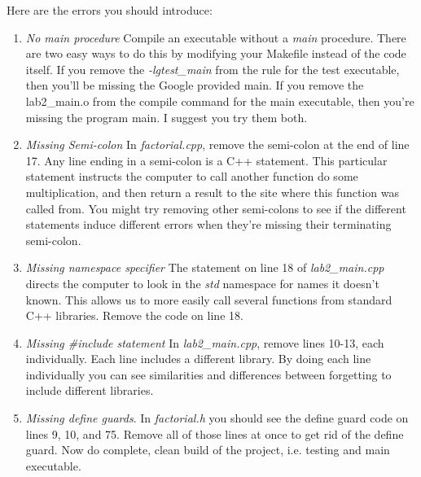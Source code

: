 \documentclass[]{tufte-handout}
\begin{document}
Here are the errors you should introduce:
\begin{enumerate}

\item \textit{No main procedure} \newline
Compile an executable without a \textit{main} procedure. There are two easy ways to do this by modifying your Makefile instead of the code itself.  If you remove the \textit{-lgtest\_main} from the rule for the test executable, then you'll be missing the Google provided main. If you remove the lab2\_main.o from the compile command for the main executable, then you're missing the program main.  I suggest you try them both.

\item \textit{Missing Semi-colon} \newline
In \textit{factorial.cpp}, remove the semi-colon at the end of line 17. Any line ending in a semi-colon is a C++ statement. This particular statement instructs the computer to call another function do some multiplication, and then return a result to the site where this function was called from. You might try removing other semi-colons to see if the different statements induce different errors when they're missing their terminating semi-colon.

\item \textit{Missing namespace specifier} \newline
The statement on line 18 of \textit{lab2\_main.cpp} directs the computer to look in the \textit{std} namespace for names it doesn't known. This allows us to more easily call several functions from standard C++ libraries. Remove the code on line 18.

\item \textit{Missing \#include statement} \newline
In \textit{lab2\_main.cpp}, remove lines 10-13, each individually. Each line includes a different library. By doing each line individually you can see similarities and differences between forgetting to include different libraries.

\item \textit{Missing define guards}. \newline
In \textit{factorial.h} you should see the define guard code on lines 9, 10, and 75.  Remove all of those lines at once to get rid of the define guard. Now do complete, clean build of the project, i.e. testing and main executable. 


\end{enumerate}
\end{document}
